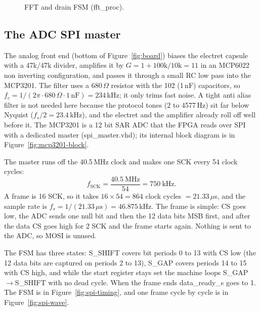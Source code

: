 \documentclass[a4paper,10pt]{article}
\begin{document}
\begin{figure}[H]
{%
}
\caption{FFT and drain FSM (fft\_proc).}
\label{fig:fft-fsm}
\end{figure}

\subsection{The ADC SPI master}
\label{sec:adc}

The analog front end (bottom of Figure~\ref{fig:board}) biases the electret capsule with a 47k/47k divider, amplifies it by $G = 1 + 100\mathrm{k}/10\mathrm{k}
= 11$ in an MCP6022 non inverting configuration, and passes it through a small RC low pass
into the MCP3201. The filter uses a $680\,\Omega$ resistor with the 102 (1\,nF) capacitors,
so
$f_c = 1/(2\pi \cdot 680\,\Omega \cdot 1\,\mathrm{nF}) = 234$\,kHz; it only trims fast noise.
A tight anti alias filter is not needed here because the protocol tones (2 to 4577\,Hz) sit
far below Nyquist ($f_s/2=23.4$\,kHz), and the electret and the amplifier already roll off
well before it. The MCP3201 is a 12 bit SAR ADC that the FPGA reads over SPI with a
dedicated master (spi\_master.vhd); its internal block diagram
is in Figure~\ref{fig:mcp3201-block}.

The master runs off the 40.5\,MHz clock and makes one SCK every 54 clock cycles:
\[
f_\mathrm{SCK} = \frac{40.5\ \mathrm{MHz}}{54} = 750\ \mathrm{kHz}.
\]
A frame is 16 SCK, so it takes $16 \times 54 = 864$ clock cycles $= 21.33\,\mu$s, and the
sample rate is $f_s = 1/(21.33\,\mu\mathrm{s}) = 46.875$\,kHz. The frame is simple: CS goes
low, the ADC sends one null bit and then the 12 data bits MSB first, and after the data CS
goes high for 2 SCK and the frame starts again. Nothing is sent to the ADC, so
MOSI is unused.

The FSM has three states: S\_SHIFT covers bit periods 0 to 13 with CS low (the 12
data bits are captured on periods 2 to 13), S\_GAP covers periods 14 to 15 with
CS high, and while the start register stays set the machine loops
S\_GAP$\to$S\_SHIFT with no dead cycle. When the frame ends
data\_ready\_s goes to 1. The FSM is in
Figure~\ref{fig:spi-timing}, and one frame cycle by cycle is in Figure~\ref{fig:spi-wave}.
\end{document}
